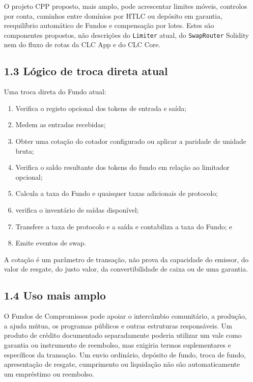 \documentclass[11pt]{article}
\begin{document}
O projeto CPP proposto, mais amplo, pode acrescentar limites móveis, controlos por conta, caminhos entre domínios por HTLC ou depósito em garantia, reequilíbrio automático de Fundos e compensação por lotes. Estes são componentes propostos, não descrições do \texttt{Limiter} atual, do \texttt{SwapRouter} Solidity nem do fluxo de rotas da CLC App e do CLC Core.

\subsection*{1.3 Lógico de troca direta atual}

Uma troca direta do Fundo atual:

\begin{enumerate}[leftmargin=*]
\item Verifica o registo opcional dos tokens de entrada e saída;
\item Medem as entradas recebidas;
\item Obter uma cotação do cotador configurado ou aplicar a paridade de unidade bruta;
\item Verifica o saldo resultante dos tokens do fundo em relação ao limitador opcional;
\item Calcula a taxa do Fundo e quaisquer taxas adicionais de protocolo;
\item verifica o inventário de saídas disponível;
\item Transfere a taxa de protocolo e a saída e contabiliza a taxa do Fundo; e
\item Emite eventos de swap.
\end{enumerate}
A cotação é um parâmetro de transação, não prova da capacidade do emissor, do valor de resgate, do justo valor, da convertibilidade de caixa ou de uma garantia.

\subsection*{1.4 Uso mais amplo}

O Fundos de Compromissos pode apoiar o intercâmbio comunitário, a produção, a ajuda mútua, os programas públicos e outras estruturas responsáveis. Um produto de crédito documentado separadamente poderia utilizar um vale como garantia ou instrumento de reembolso, mas exigiria termos suplementares e específicos da transação. Um envio ordinário, depósito de fundo, troca de fundo, apresentação de resgate, cumprimento ou liquidação não são automaticamente um empréstimo ou reembolso.
\end{document}
